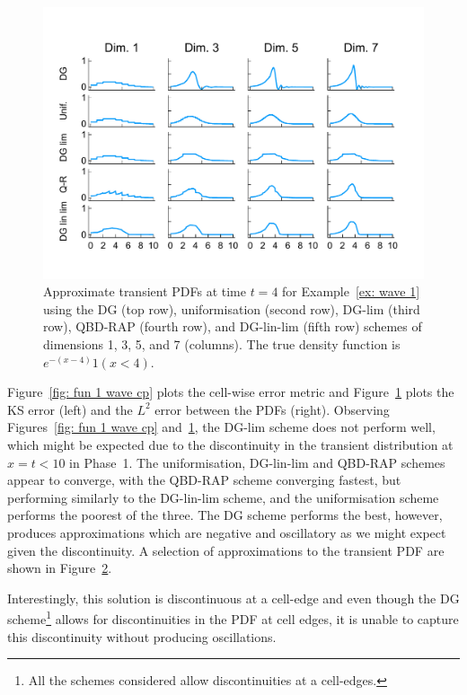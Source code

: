 \begin{example}
\begin{figure}[h]
		\label{fig: fun 1 wave} 
	\end{figure}
	\begin{figure}[h]
		\centering
		\includegraphics[width=\textwidth,trim={0cm 1.25cm 0cm 1.25cm},clip]{chapter6/figs/wave/fun1/pdf_formatted.pdf}
		\caption{Approximate transient PDFs at time \(t=4\) for Example~\ref{ex: wave 1} using the DG (top row), uniformisation (second row), DG-lim (third row), QBD-RAP (fourth row), and DG-lin-lim (fifth row) schemes of dimensions 1, 3, 5, and 7 (columns). The true density function is \(e^{-(x-4)}1(x<4)\).} 
		\label{fig: pdf wave fun 1}
	\end{figure} 
	Figure~\ref{fig: fun 1 wave cp} plots the cell-wise error metric and Figure~\ref{fig: fun 1 wave} plots the KS error (left) and the \(L^2\) error between the PDFs (right). Observing Figures~\ref{fig: fun 1 wave cp} and~\ref{fig: fun 1 wave}, the DG-lim scheme does not perform well, which might be expected due to the discontinuity in the transient distribution at \(x=t<10\) in Phase~1. The uniformisation, DG-lin-lim and QBD-RAP schemes appear to converge, with the QBD-RAP scheme converging fastest, but performing similarly to the DG-lin-lim scheme, and the uniformisation scheme performs the poorest of the three. The DG scheme performs the best, however, produces approximations which are negative and oscillatory as we might expect given the discontinuity. A selection of approximations to the transient PDF are shown in Figure~\ref{fig: pdf wave fun 1}.

	Interestingly, this solution is discontinuous at a cell-edge and even though the DG scheme\footnote{All the schemes considered allow discontinuities at a cell-edges.} allows for discontinuities in the PDF at cell edges, it is unable to capture this discontinuity without producing oscillations. 
\end{example} 

